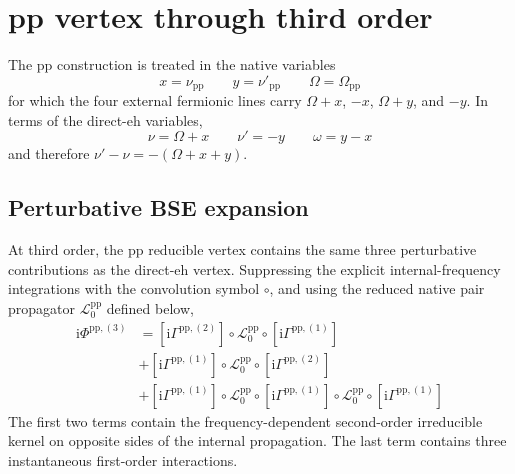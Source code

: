 \documentclass[aip,jcp,reprint,noshowkeys,superscriptaddress]{revtex4-1}
\newcommand{\ii}{\mathrm{i}}
\newcommand{\eh}{\text{eh}}
\newcommand{\pp}{\text{pp}}
\begin{document}
\section{pp vertex through third order}
\label{sec:pp_third}

The $\pp$ construction is treated in the native variables
\begin{equation}
    x=\nu_\pp
    \qquad
    y=\nu'_\pp
    \qquad
    \Omega=\Omega_\pp
    \label{eq:pp_native_variables_third}
\end{equation}
for which the four external fermionic lines carry
$\Omega+x$, $-x$, $\Omega+y$, and $-y$.
In terms of the direct-$\eh$ variables,
\begin{equation}
    \nu=\Omega+x
    \qquad
    \nu'=-y
    \qquad
    \omega=y-x
    \label{eq:pp_inverse_frequency_map_third}
\end{equation}
and therefore $\nu'-\nu=-(\Omega+x+y)$.

\subsection{Perturbative BSE expansion}

At third order, the $\pp$ reducible vertex contains the same three
perturbative contributions as the direct-$\eh$ vertex.
Suppressing the explicit internal-frequency integrations with the convolution
symbol $\circ$, and using the reduced native pair propagator
$\mathcal L_0^\pp$ defined below,
\begin{equation}
    \begin{split}
    \ii\Phi^{\pp,(3)}
    & =
    \left[\ii\Gamma^{\pp,(2)}\right]
    \circ\mathcal L_0^\pp
    \circ\left[\ii\Gamma^{\pp,(1)}\right]
    \\
    &+
    \left[\ii\Gamma^{\pp,(1)}\right]
    \circ\mathcal L_0^\pp
    \circ\left[\ii\Gamma^{\pp,(2)}\right]
    \\
    &+
    \left[\ii\Gamma^{\pp,(1)}\right]
    \circ\mathcal L_0^\pp
    \circ\left[\ii\Gamma^{\pp,(1)}\right]
    \circ\mathcal L_0^\pp
    \circ\left[\ii\Gamma^{\pp,(1)}\right]
    \end{split}
    \label{eq:Phi_pp_third_convolution}
\end{equation}
The first two terms contain the frequency-dependent second-order irreducible
kernel on opposite sides of the internal propagation.
The last term contains three instantaneous first-order interactions.
\end{document}
